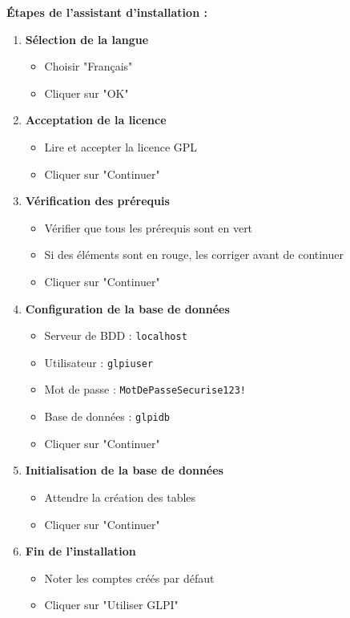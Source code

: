 \documentclass[12pt,a4paper]{article}
\begin{document}
\textbf{Étapes de l'assistant d'installation :}
\begin{enumerate}
    \item \textbf{Sélection de la langue}
    \begin{itemize}
        \item Choisir "Français"
        \item Cliquer sur "OK"
    \end{itemize}
    
    \item \textbf{Acceptation de la licence}
    \begin{itemize}
        \item Lire et accepter la licence GPL
        \item Cliquer sur "Continuer"
    \end{itemize}
    
    \item \textbf{Vérification des prérequis}
    \begin{itemize}
        \item Vérifier que tous les prérequis sont en vert
        \item Si des éléments sont en rouge, les corriger avant de continuer
        \item Cliquer sur "Continuer"
    \end{itemize}
    
    \item \textbf{Configuration de la base de données}
    \begin{itemize}
        \item Serveur de BDD : \texttt{localhost}
        \item Utilisateur : \texttt{glpiuser}
        \item Mot de passe : \texttt{MotDePasseSecurise123!}
        \item Base de données : \texttt{glpidb}
        \item Cliquer sur "Continuer"
    \end{itemize}
    
    \item \textbf{Initialisation de la base de données}
    \begin{itemize}
        \item Attendre la création des tables
        \item Cliquer sur "Continuer"
    \end{itemize}
    
    \item \textbf{Fin de l'installation}
    \begin{itemize}
        \item Noter les comptes créés par défaut
        \item Cliquer sur "Utiliser GLPI"
    \end{itemize}
\end{enumerate}
\end{document}
